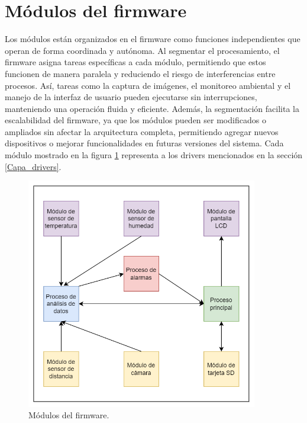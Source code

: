 \section{Módulos del firmware}

Los módulos están organizados en el firmware como funciones independientes que operan de forma coordinada y autónoma. Al segmentar el procesamiento, el firmware asigna tareas específicas a cada módulo, permitiendo que estos funcionen de manera paralela y reduciendo el riesgo de interferencias entre procesos. Así, tareas como la captura de imágenes, el monitoreo ambiental y el manejo de la interfaz de usuario pueden ejecutarse sin interrupciones, manteniendo una operación fluida y eficiente. Además, la segmentación facilita la escalabilidad del firmware, ya que los módulos pueden ser modificados o ampliados sin afectar la arquitectura completa, permitiendo agregar nuevos dispositivos o mejorar funcionalidades en futuras versiones del sistema. Cada módulo mostrado en la figura \ref{fig:modulos_del_firmware} representa a los drivers mencionados en la sección \ref{Capa_drivers}.

\newpage

\vspace{1cm}
\begin{figure}[htbp]
	\centering
	\includegraphics[width=0.9\textwidth, height=0.5\textheight]{./Figures/modulos_del_firmware.png}
	\caption{Módulos del firmware.}
	\label{fig:modulos_del_firmware}
\end{figure}
\vspace{1cm}

